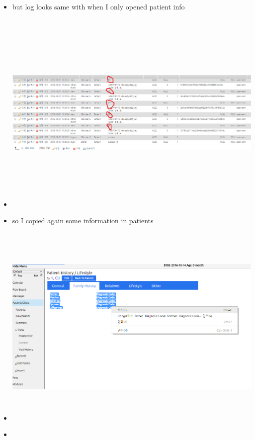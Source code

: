 \documentclass[paper=a4, fontsize=11pt]{scrartcl} %
\numberwithin{equation}{section} %
\numberwithin{figure}{section} %
\numberwithin{table}{section} %
\begin{document}
\begin{itemize}
\begin{itemize}
		\item but log looks same with when I only opened patient info
		\item
		 \includegraphics[width = 20cm, height=10cm]{pictures/stillsame.png}
		\item so I copied again some information in patients
		\item
		 \includegraphics[width = 20cm, height=10cm]{pictures/copyagain.png}
		\item

\end{itemize}
\end{itemize}
\end{document}
